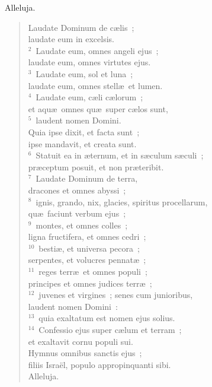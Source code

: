 \lettrine[lines=3,image=true,loversize=0.05,lraise=-0.03]{A}{}lleluja. \begin{flushleft}\begin{verse}\vspace{6pt}Laudate Dominum de c\ae lis~;\\ laudate eum in excelsis.\\
${}^{2}$~Laudate eum, omnes angeli ejus~;\\ laudate eum, omnes virtutes ejus.\\
${}^{3}$~Laudate eum, sol et luna~;\\ laudate eum, omnes stell\ae\ et lumen.\\
${}^{4}$~Laudate eum, c\ae li c\ae lorum~;\\ et aqu\ae\ omnes qu\ae\ super c\ae los sunt,\\
${}^{5}$~laudent nomen Domini.\\ Quia ipse dixit, et facta sunt~;\\ ipse mandavit, et creata sunt.\\
${}^{6}$~Statuit ea in \ae ternum, et in s\ae culum s\ae culi~;\\ pr\ae ceptum posuit, et non pr\ae teribit.\\
${}^{7}$~Laudate Dominum de terra,\\ dracones et omnes abyssi~;\\
${}^{8}$~ignis, grando, nix, glacies, spiritus procellarum,\\ qu\ae\ faciunt verbum ejus~;\\
${}^{9}$~montes, et omnes colles~;\\ ligna fructifera, et omnes cedri~;\\
${}^{10}$~besti\ae , et universa pecora~;\\ serpentes, et volucres pennat\ae~;\\
${}^{11}$~reges terr\ae\ et omnes populi~;\\ principes et omnes judices terr\ae~;\\
${}^{12}$~juvenes et virgines~; senes cum junioribus,\\ laudent nomen Domini~:\\
${}^{13}$~quia exaltatum est nomen ejus solius.\\
${}^{14}$~Confessio ejus super c\ae lum et terram~;\\ et exaltavit cornu populi sui.\\ Hymnus omnibus sanctis ejus~;\\ filiis Isra\"el, populo appropinquanti sibi.\\ Alleluja.\end{verse}\end{flushleft}



